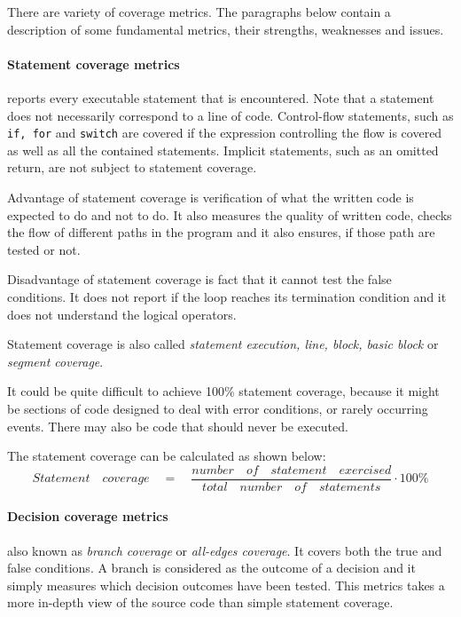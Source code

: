There are variety of coverage metrics. The paragraphs below contain a description of some fundamental metrics, their strengths, weaknesses and issues. 

\paragraph{Statement coverage metrics} reports every executable statement that is encountered.  Note that a statement does not necessarily correspond to a line of code. Control-flow statements, such as \texttt{if, for} and \texttt{switch} are covered if the expression controlling the flow is covered as well as all the contained statements. Implicit statements, such as an omitted return, are not subject to statement coverage. 

Advantage of statement coverage is verification of what the written code is expected to do and not to do. It also measures the quality of written code, checks the flow of different paths in the program and it also ensures, if those path are tested or not.

Disadvantage of statement coverage is fact that it cannot test the false conditions. It does not report if the loop reaches its termination condition and it does not understand the logical operators.

Statement coverage is also called \textit{statement execution, line, block, basic block} or \textit{segment coverage}.

It could be quite difficult to achieve 100\% statement coverage, because it might be sections of code designed to deal with error conditions, or rarely occurring events. There may also be code that should never be executed.

The statement coverage can be calculated as shown below:
\begin{equation}
Statement\quad coverage\quad =\quad \frac { number\quad of\quad statement\quad exercised }{ total\quad number\quad of\quad statements } \cdot 100\%
\end{equation}


\paragraph{Decision coverage metrics} also known as \textit{branch coverage} or \textit{all-edges coverage}. It covers both the true and false conditions.  A branch is considered as the outcome of a decision and it  simply measures which decision outcomes have been tested. This metrics takes a more in-depth view of the source code than simple statement coverage.

